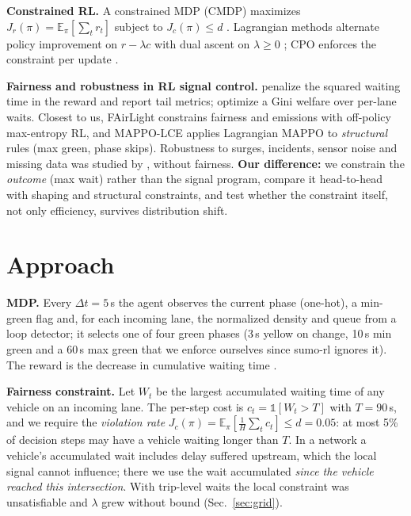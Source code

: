 \documentclass{article}
\begin{document}
\textbf{Constrained RL.} A constrained MDP (CMDP) maximizes
$J_r(\pi)=\mathbb{E}_\pi[\sum_t r_t]$ subject to $J_c(\pi)\le d$ \cite{Altman99}.
Lagrangian methods alternate policy improvement on $r-\lambda c$ with dual ascent on
$\lambda\ge 0$ \cite{TesslerMM19,RayAA19,StookeAA20}; CPO enforces the constraint per update
\cite{AchiamHTA17}.

\textbf{Fairness and robustness in RL signal control.} \citet{RaeisL21} penalize the
squared waiting time in the reward and report tail metrics; \citet{SiddiqueWZ20} optimize a
Gini welfare over per-lane waits. Closest to us, FAirLight \cite{HaydariAZC25} constrains
fairness and emissions with off-policy max-entropy RL, and MAPPO-LCE \cite{SatheeshP25}
applies Lagrangian MAPPO to \emph{structural} rules (max green, phase skips). Robustness to
surges, incidents, sensor noise and missing data was studied by
\cite{RodriguesA19,TanSS20,MeiLSW23,ShiDLC23}, without fairness.
\textbf{Our difference:} we constrain the \emph{outcome} (max wait) rather than the signal
program, compare it head-to-head with shaping and structural constraints, and test whether
the constraint itself, not only efficiency, survives distribution shift.

\section{Approach}\label{sec:method}
\textbf{MDP.} Every $\Delta t=5$\,s the agent observes the current phase (one-hot), a
min-green flag and, for each incoming lane, the normalized density and queue from a loop
detector; it selects one of four green phases (3\,s yellow on change, 10\,s min green and a
60\,s max green that we enforce ourselves since sumo-rl ignores it). The reward is the
decrease in cumulative waiting time \cite{sumorl}.

\textbf{Fairness constraint.} Let $W_t$ be the largest accumulated waiting time of any vehicle
on an incoming lane. The per-step cost is $c_t=\mathbb{1}[W_t>T]$ with $T=90$\,s, and we
require the \emph{violation rate} $J_c(\pi)=\mathbb{E}_\pi[\frac1H\sum_t c_t]\le d=0.05$:
at most 5\% of decision steps may have a vehicle waiting longer than $T$.
In a network a vehicle's accumulated wait includes delay suffered upstream, which the local
signal cannot influence; there we use the wait accumulated \emph{since the vehicle reached
this intersection}. With trip-level waits the local constraint was unsatisfiable and
$\lambda$ grew without bound (Sec.~\ref{sec:grid}).
\end{document}
